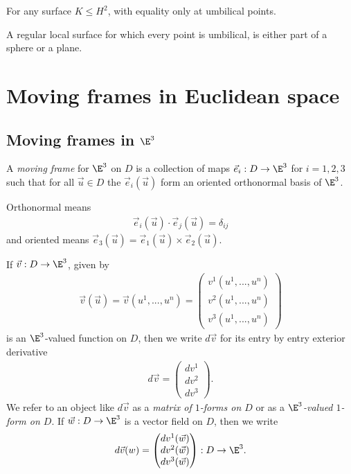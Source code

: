 \documentclass{article}
\begin{document}
\begin{lemma}[Notes 9.22]
    For any surface $K\leq H^2$, with equality only at umbilical points.
\end{lemma}

\begin{theorem}[Notes 9.23]
    A regular local surface for which every point is umbilical, is either part of a sphere
    or a plane.
\end{theorem}

\section{Moving frames in Euclidean space}

\subsection{Moving frames in $\E^3$}

\begin{definition}
    A \emph{moving frame} for $\E^3$ on $D$ is a collection of maps $\vec e_i:D\to\E^3$
    for $i=1,2,3$ such that for all $\vec u\in D$ the $\vec e_i(\vec u)$ form an oriented orthonormal
    basis of $\E^3$.

    Orthonormal means
    \begin{align*}
        \vec e_i(\vec u) \cdot \vec e_j(\vec u) = \delta_{ij}
    \end{align*}
    and oriented means $\vec e_3(\vec u) = \vec e_1(\vec u) \times \vec e_2(\vec u)$.
\end{definition}

\begin{definition}
    If $\vec v:D\to\E^3$, given by
    \begin{align*}
        \vec v(\vec u)=\vec v(u^1,...,u^n)=\begin{pmatrix}
            v^1(u^1,...,u^n) \\
            v^2(u^1,...,u^n) \\
            v^3(u^1,...,u^n)
        \end{pmatrix}
    \end{align*}
    is an $\E^3$-valued function on $D$, then we write $d\vec v$ for its entry
    by entry exterior derivative
    \begin{align*}
        d\vec v = \begin{pmatrix}
            dv^1 \\ dv^2 \\ dv^3
        \end{pmatrix}.
    \end{align*}
    We refer to an object like $d\vec v$ as a \emph{matrix of $1$-forms on $D$} or as a
    \emph{$\E^3$-valued $1$-form on $D$}. If $\vec w:D\to\E^3$ is a vector field on $D$, then we write
    \begin{align*}
        d\vec v(w) = \begin{pmatrix}
            dv^1(\vec w) \\ dv^2(\vec w) \\ dv^3(\vec w)
        \end{pmatrix} : D\to\E^3.
    \end{align*}
\end{definition}
\end{document}
